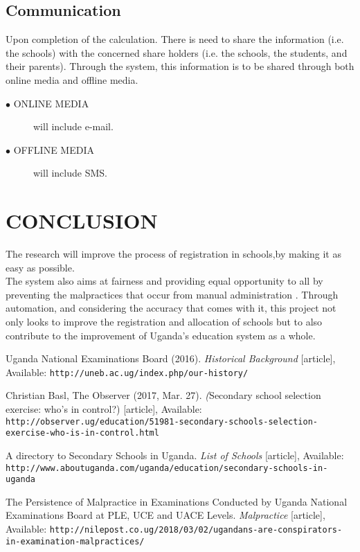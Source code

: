 \documentclass {article}
\begin{document}
\subsection{Communication}
Upon completion of the calculation. There is need to share the information (i.e. the schools) with the concerned share holders (i.e. the schools, the students, and their parents). Through the system, this information is to be shared through both online media and offline media.  

\begin{description}
  \item[$\bullet$ ONLINE MEDIA] will include e-mail.
  \item[$\bullet$ OFFLINE MEDIA] will include SMS.
\end{description}

\section{CONCLUSION}
The research will improve the process of registration in schools,by making it as easy as possible.\\
The system also aims at fairness and providing equal opportunity to all by preventing the malpractices that occur from manual administration \cite{article4}.
Through automation, and considering the accuracy that comes with it, this project not only looks to improve the registration and allocation of schools but to also contribute to the improvement of Uganda's education system as a whole.\\


\begin{thebibliography}{10}

 Uganda National Examinations Board (2016).  
\emph{Historical Background} [article], 
Available:  \texttt{http://uneb.ac.ug/index.php/our-history/}

 Christian Basl, The Observer (2017, Mar. 27). 
\emph(Secondary school selection exercise: who's in control?) [article], 
Available: \texttt{http://observer.ug/education/51981-secondary-schools-selection-exercise-who-is-in-control.html}

 A directory to Secondary Schools in Uganda.  
\emph{List of Schools} [article], 
Available:  \texttt{http://www.aboutuganda.com/uganda/education/secondary-schools-in-uganda}

 The Persistence of Malpractice in Examinations Conducted by Uganda National Examinations Board at PLE, UCE and UACE Levels.  
\emph{Malpractice} [article], 
Available:  \texttt{http://nilepost.co.ug/2018/03/02/ugandans-are-conspirators-in-examination-malpractices/}


\end{thebibliography}
\end{document}
